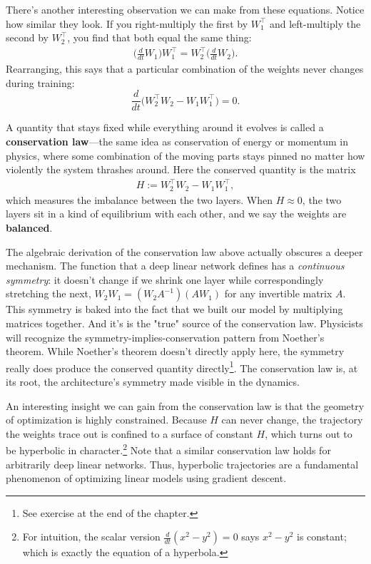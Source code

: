 There's another interesting observation we can make from these equations. Notice how similar they look. If you right-multiply the first by $W_1^\top$ and left-multiply the second by $W_2^\top$, you find that both equal the same thing:
\begin{align*}
    \Big(\tfrac{d}{dt}W_1\Big)W_1^\top = W_2^\top\Big(\tfrac{d}{dt}W_2\Big).
\end{align*}
Rearranging, this says that a particular combination of the weights never changes
during training:
\begin{equation}
    \frac{d}{dt}\big(W_2^\top W_2 - W_1 W_1^\top\big) = 0.
    \label{eq:conservation}
\end{equation}

A quantity that stays fixed while everything around it evolves is called a
\textbf{conservation law}---the same idea as conservation of energy or momentum in
physics, where some combination of the moving parts stays pinned no matter how
violently the system thrashes around. Here the conserved quantity is the matrix
\begin{align*}
    H := W_2^\top W_2 - W_1 W_1^\top,
\end{align*}
which measures the imbalance between the two layers. When $H \approx 0$, the two
layers sit in a kind of equilibrium with each other, and we say the weights are
\textbf{balanced}.

The algebraic derivation of the conservation law above actually obscures a deeper mechanism. The function that a deep linear network defines has a \emph{continuous symmetry}: it doesn't change if we shrink one layer while correspondingly stretching the next, $W_2W_1 = (W_2A^{-1})(AW_1)$ for any invertible matrix $A$. This symmetry is baked into the fact that we built our model by multiplying matrices together. And it's is the "true" source of the conservation law. Physicists will recognize the symmetry-implies-conservation pattern from Noether's theorem. While Noether's theorem doesn't directly apply here, the symmetry really does produce the conserved quantity directly\footnote{See exercise at the end of the chapter.}. The conservation law is, at its root, the architecture's symmetry made visible in the dynamics.

An interesting insight we can gain from the conservation law is that the geometry of optimization is highly constrained. Because $H$ can never change, the trajectory the weights trace out is confined to a surface of constant $H$, which turns out to be hyperbolic in character.\footnote{For intuition, the scalar version $\frac{d}{dt}(x^2 - y^2) = 0$ says $x^2 - y^2$ is constant; which is exactly the
equation of a hyperbola.} Note that a similar conservation law holds for arbitrarily deep linear networks. Thus, hyperbolic trajectories are a fundamental phenomenon of optimizing linear models using gradient descent.

